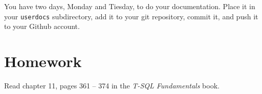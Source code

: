 \documentclass{article}
\begin{document}
    You have two days, Monday and Tiesday, to do your documentation. Place it in your \texttt{userdocs} subdirectory, add it to your git repository, commit it, and push it to your Github account.
    \section{Homework}

            Read chapter  11, pages 361  -- 374  in the \textit{T-SQL Fundamentals} book.
        
\end{document}
